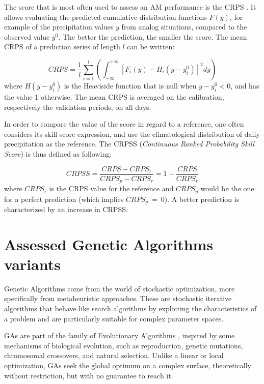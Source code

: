 \documentclass{ametsoc}
\begin{document}
The score that is most often used to assess an AM performance is the CRPS \citep[Continuous Ranked Probability Score,][]{Brown1974, Matheson1976, Hersbach2000}. It allows evaluating the predicted cumulative distribution functions $F(y)$, for example of the precipitation values $y$ from analog situations, compared to the observed value $y^{0}$. The better the prediction, the smaller the score. The mean CRPS of a prediction series of length $l$ can be written:

\begin{equation}
\label{eq:CRPS}
CRPS = \frac{1}{l} \sum_{i=1}^{l} \left(  \int_{-\infty}^{+\infty} \left[ F_{i}(y)-H_{i}(y-y_{i}^{0})\right]^{2} dy \right) 
\end{equation}
where $H(y-y_{i}^{0})$ is the Heaviside function that is null when $y-y_{i}^{0}<0$, and has the value 1 otherwise. The mean CRPS is averaged on the calibration, respectively the validation periods, on all days.

In order to compare the value of the score in regard to a reference, one often considers its skill score expression, and use the climatological distribution of daily precipitation as the reference. The CRPSS (\textit{Continuous Ranked Probability Skill Score}) is thus defined as following:

\begin{equation}
\label{eq:CRPSS}
CRPSS = \frac{CRPS-CRPS_{r}}{CRPS_{p}-CRPS_{r}} = 1-\frac{CRPS}{CRPS_{r}}
\end{equation}
where $CRPS_{r}$ is the CRPS value for the reference and $CRPS_{p}$ would be the one for a perfect prediction (which implies $CRPS_{p}~=~0$). A better prediction is characterized by an increase in CRPSS.


\section{Assessed Genetic Algorithms variants}
\label{sec:gas}

Genetic Algorithms \citep[GAs,][]{Holland1992b, Goldberg1989} come from the world of stochastic optimization, more specifically from metaheuristic approaches. These are stochastic iterative algorithms that behave like search algorithms by exploiting the characteristics of a problem and are particularly suitable for complex parameter spaces.

GAs are part of the family of Evolutionary Algorithms \citep{Back1993b, Schwefel1993}, inspired by some mechanisms of biological evolution, such as reproduction, genetic mutations, chromosomal crossovers, and natural selection. Unlike a linear or local optimization, GAs seek the global optimum on a complex surface, theoretically without restriction, but with no guarantee to reach it.
\end{document}
